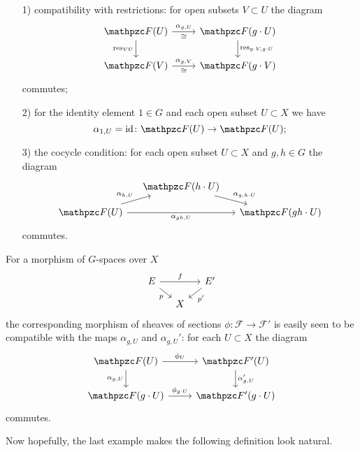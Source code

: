 \begin{nameless}
  \begin{enumerate}
  \item[1)] compatibility with restrictions: for open subsets $V\subset U$ the
    diagram
    \[ \begin{tikzcd}
        \mathcal{F} (U)\ar{r}{\alpha_{g,U}}[swap]{\isom}\ar{d}[swap]{\res_{VU}} & \mathcal{F} (g\cdot U)\ar{d}{\res_{g\cdot V,g\cdot U}} \\
        \mathcal{F} (V)\ar{r}{\alpha_{g,V}}[swap]{\isom} & \mathcal{F} (g\cdot V)
      \end{tikzcd} \]
    commutes;

  \item[2)] for the identity element $1\in G$ and each open subset $U \subset X$
    we have
    $$\alpha_{1,U} = \idid\colon \mathcal{F} (U) \to \mathcal{F} (U);$$

  \item[3)] the cocycle condition: for each open subset $U \subset X$ and
    $g,h\in G$ the diagram
    \[ \begin{tikzcd}[row sep=small, column sep=small]
        & \mathcal{F} (h\cdot U) \ar{dr}{\alpha_{g,h\cdot U}} \\
        \mathcal{F} (U)\ar{ur}{\alpha_{h,U}}\ar{rr}[swap]{\alpha_{gh,U}} & & \mathcal{F} (gh\cdot U)
      \end{tikzcd} \]
  commutes.
  \end{enumerate}

  For a morphism of $G$-spaces over $X$
  \[ \begin{tikzcd}[row sep=small, column sep=small]
      E\ar{rr}{f}\ar{dr}[swap]{p} && E'\ar{dl}{p'} \\
      & X
    \end{tikzcd} \]
  the corresponding morphism of sheaves of sections
  $\phi\colon \mathcal{F} \to \mathcal{F}'$ is easily seen to be compatible with
  the maps $\alpha_{g,U}$ and $\alpha_{g,U}'$: for each $U \subset X$ the
  diagram
  \[ \begin{tikzcd}
      \mathcal{F} (U) \ar{r}{\phi_U}\ar{d}[swap]{\alpha_{g,U}} & \mathcal{F}' (U) \ar{d}{\alpha'_{g,U}} \\
      \mathcal{F} (g\cdot U) \ar{r}{\phi_{g\cdot U}} & \mathcal{F}' (g\cdot U)
    \end{tikzcd} \]
  commutes.
\end{nameless}

Now hopefully, the last example makes the following definition look natural.

